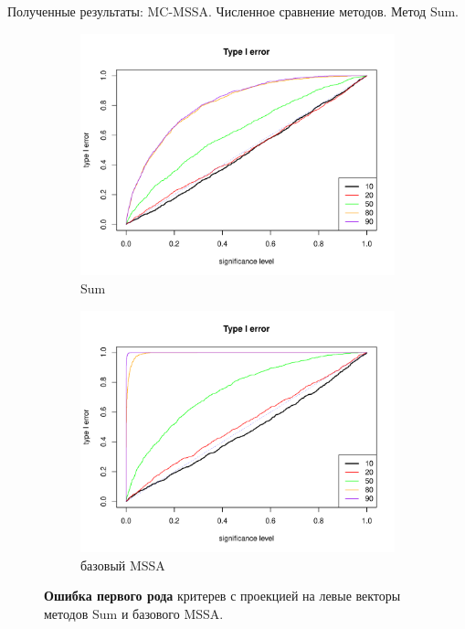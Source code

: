 \documentclass[ucs, notheorems, handout]{beamer}
\begin{document}
\begin{frame}{Полученные результаты: MC-MSSA. Численное сравнение методов. Метод Sum.}
	\begin{figure}
		\captionsetup[subfigure]{justification=Centering}
		\begin{subfigure}[t]{0.45\textwidth}
			\centering
			\includegraphics[width=\textwidth]{type1error_sum_ev.pdf}
			\caption{Sum}\label{fig:error_sum}
		\end{subfigure}\hspace{\fill}
		\begin{subfigure}[t]{0.45\textwidth}
			\centering
			\includegraphics[width=\textwidth]{type1error_mssa_ev.pdf}
			\caption{базовый MSSA}
		\end{subfigure}
		\caption{\textbf{Ошибка первого рода} критерев с проекцией на левые векторы методов Sum и базового MSSA.}
	\end{figure}
\end{frame}
\end{document}
